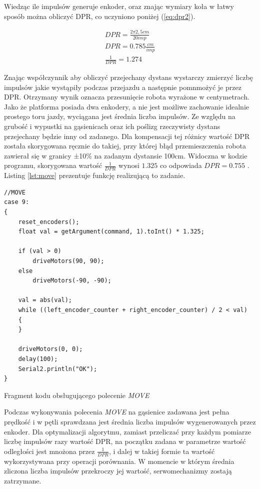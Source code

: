 Wiedząc ile impulsów generuje enkoder, oraz znając wymiary koła w łatwy sposób można obliczyć DPR, co uczyniono poniżej (\ref{eq:dpr2}).

\begin{equation}
\begin{aligned}
    DPR = \frac{2 \pi 2,5cm}{20imp} \\[5pt]
    DPR = 0.785 \frac{cm}{imp} \\[5pt]
    \frac{1}{DPR} = 1.274
\end{aligned}
\label{eq:dpr2}
\end{equation}

Znając współczynnik aby obliczyć przejechany dystans wystarczy zmierzyć liczbę impulsów jakie wystąpiły podczas przejazdu a następnie pomnmożyć je przez DPR. Otrzymany wynik oznacza przesunięcie robota wyrażone w centymetrach. Jako że platforma posiada dwa enkodery, a nie jest możliwe zachowanie idealnie prostego toru jazdy, wyciągana jest średnia liczba impulsów. Ze względu na grubość i wypustki na gąsienicach oraz ich poślizg rzeczywisty dystans przejechany będzie inny od zadanego. Dla kompensacji tej różnicy wartość DPR została skorygowana ręcznie do takiej, przy której błąd przemieszczenia robota zawierał się w granicy ±10\% na zadanym dystansie 100cm. Widoczna w kodzie programu, skorygowana wartość $\frac{1}{DPR}$ wynosi $1.325$ co odpowiada $DPR=0.755$ . Listing \ref{lst:move} prezentuje funkcję realizującą to zadanie.

\begin{listing}[ht]
\begin{verbatim}
//MOVE
case 9:
{
    reset_encoders();
    float val = getArgument(command, 1).toInt() * 1.325;

    if (val > 0)
        driveMotors(90, 90);
    else
        driveMotors(-90, -90);

    val = abs(val);
    while ((left_encoder_counter + right_encoder_counter) / 2 < val)
    {
    }

    driveMotors(0, 0);
    delay(100);
    Serial2.println("OK");
}
\end{verbatim}
\caption{Fragment kodu obsługującego polecenie \emph{MOVE}}
\label{lst:move}
\end{listing}



Podczas wykonywania polecenia \emph{MOVE} na gąsienice zadawana jest pełna prędkość i w pętli sprawdzana jest średnia liczba impulsów wygenerowanych przez enkoder. Dla optymalizacji algorytmu, zamiast przeliczać przy każdym pomiarze liczbę impulsów razy wartość DPR, na początku zadana w parametrze wartość odległości jest mnożona przez $\frac{1}{DPR}$, i dalej w takiej formie ta wartość wykorzystywana przy operacji porównania. W momencie w którym średnia zliczona liczba impulsów przekroczy jej wartość, serwomechanizmy zostają zatrzymane.
\\ 


